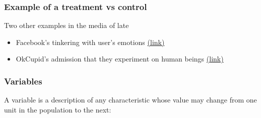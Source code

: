 \documentclass[slides]{beamer}
\newcommand{\blue}[1]{\textcolor{blue2}{#1}}
\begin{document}
\begin{frame}
\frametitle{Example of a treatment vs control}
Two other examples in the media of late
\begin{itemize}
\item Facebook's tinkering with user's emotions \blue{\href{http://www.nytimes.com/2014/06/30/technology/facebook-tinkers-with-users-emotions-in-news-feed-experiment-stirring-outcry.html}{(link)}}
\item OkCupid's admission that they experiment on human beings \blue{\href{http://blog.okcupid.com/index.php/we-experiment-on-human-beings/}{(link)}}
\end{itemize}

\end{frame}



\begin{frame}[fragile]
\frametitle{Variables}
A \blue{variable} is a description of any characteristic whose value may change from one unit in the population to the next:
\vspace{3in}

\end{frame}



%
\end{document}
